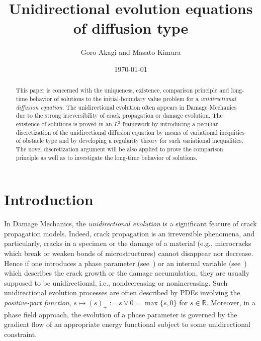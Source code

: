 \documentclass[reqno,10pt]{amsart}
\begin{document}
\title{Unidirectional evolution equations of diffusion type}

\author{Goro Akagi \quad and \quad Masato Kimura}
\address[Goro Akagi]{Graduate School of System Informatics, Kobe University,
1-1 Rokkodai-cho, Nada-ku, Kobe 657-8501 Japan}

\address[Masato Kimura]{Faculty of Mathematics and Physics, 
Institute of Science and Engineering, Kanazawa University, 
Kakuma, Kanazawa 920-1192 Japan 
}

\date{\today}



\begin{abstract} 
 This paper is concerned with the uniqueness, existence, comparison
 principle and long-time behavior of solutions to the
 initial-boundary value problem for a \emph{unidirectional diffusion
 equation}. The unidirectional evolution often appears in Damage
 Mechanics due to the strong irreversibility of crack propagation or
 damage evolution. The existence of solutions is proved in an
 $L^2$-framework by introducing a
 peculiar discretization of the unidirectional diffusion equation by
 means of variational inequities of obstacle type and by developing a
 regularity theory for such variational inequalities. The novel
 discretization argument will be also applied to prove the comparison
 principle as well as to investigate the long-time behavior of solutions.
\end{abstract} 

\maketitle

\section{Introduction}\label{sec1} 

In Damage Mechanics, the \emph{unidirectional evolution} is a significant
feature of crack propagation models. Indeed, crack propagation is an
irreversible phenomena, and particularly, cracks in a specimen or the
damage of a material (e.g., microcracks which break or weaken bonds of
microstructures) cannot disappear nor decrease. Hence if one introduces a
phase parameter (see~\cite{Mi04,KMZ08,T-K09,K-T10,KRC13}) or an internal
variable (see~\cite{BaPr93,BeBi97}) which describes the crack growth
or the damage accumulation, they are usually supposed to be
unidirectional, i.e., nondecreasing or nonincreasing. Such
unidirectional evolution processes are often described by PDEs involving
the \emph{positive-part function}, $s \mapsto (s)_+ := s \vee 0 =
\max\{s,0\}$ for $s \in {{\mathbb R}}$. Moreover, in a phase field approach, the evolution of a phase
parameter is governed by the gradient flow of an appropriate energy
functional subject to some unidirectional constraint.
\end{document}
